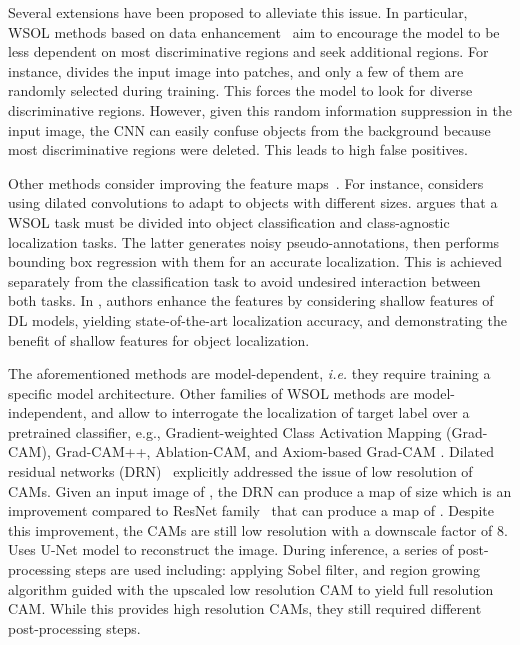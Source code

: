 \documentclass[twocolumn]{article}
\makeatletter
\theoremstyle{definition}
\newcommand*{\ie}{\emph{i.e.}\@\xspace}
\makeatother
\begin{document}
Several extensions have been proposed to alleviate this issue. In particular, WSOL methods based on data enhancement~\cite{ChoeS19,SinghL17, WeiFLCZY17,YunHCOYC19, ZhangWF0H18} aim to encourage the model to be less dependent on most discriminative regions and seek additional regions. For instance, \cite{SinghL17} divides the input image into patches, and only a few of them are randomly selected during training. This forces the model to look for diverse discriminative regions. However, given this random information suppression in the input image, the CNN can easily confuse objects from the background because most discriminative regions were deleted. This leads to high false positives.

Other methods consider improving the feature maps~\cite{LeeKLLY19,RahimiSAHB20,wei2021shallowspol,WeiXSJFH18,XueLWJJY19iccvdanet,YangKKK20,ZhangCW20,ZhangWKYH18}. For instance, \cite{WeiXSJFH18} considers using dilated convolutions to adapt to objects with different sizes. \cite{ZhangCW20} argues that a WSOL task must be divided into object classification and class-agnostic localization tasks. The latter generates noisy pseudo-annotations, then performs bounding box regression with them for an accurate localization. This is achieved separately from the classification task to avoid undesired interaction between both tasks. In \cite{wei2021shallowspol}, authors enhance the features by considering shallow features of DL models, yielding state-of-the-art localization accuracy, and demonstrating the benefit of shallow features for object localization.

The aforementioned methods are model-dependent, \ie they require training a specific model architecture. Other families of WSOL methods are model-independent, and allow to interrogate the localization of target label over a pretrained classifier, e.g., Gradient-weighted Class Activation Mapping (Grad-CAM), Grad-CAM++, Ablation-CAM, and Axiom-based Grad-CAM \cite{fu2020axiom, lin2013network, PinheiroC15cvpr}. Dilated residual networks (DRN)~\cite{YuKF17} explicitly addressed the issue of low resolution of CAMs. Given an input image of , the DRN can produce a map of size  which is an improvement compared to ResNet family~\cite{heZRS16} that can produce a map of . Despite this improvement, the CAMs are still low resolution with a downscale factor of 8. \cite{TagarisSS19} Uses U-Net model to reconstruct the image. During inference, a series of post-processing steps are used including: applying Sobel filter, and region growing algorithm guided with the upscaled low resolution CAM to yield full resolution CAM. While this provides high resolution CAMs, they still required different post-processing steps.
\end{document}
